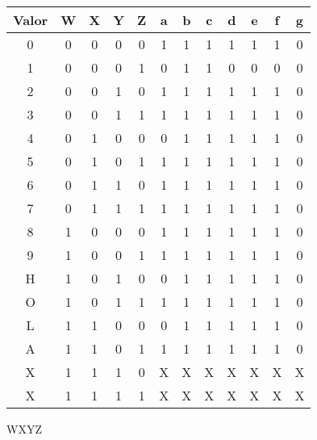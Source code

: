 


  \begin{center}
    \begin{tabular}{ c | c | c | c | c || c | c | c | c | c | c | c}
      Valor & W & X & Y & Z & a & b & c & d & e & f & g \\
      \toprule
      0 & 0 & 0 & 0 & 0 & 1 & 1 & 1 & 1 & 1 & 1 & 0 \\
      1 & 0 & 0 & 0 & 1 & 0 & 1 & 1 & 0 & 0 & 0 & 0 \\
      \midrule
      2 & 0 & 0 & 1 & 0 & 1 & 1 & 1 & 1 & 1 & 1 & 0 \\
      3 & 0 & 0 & 1 & 1 & 1 & 1 & 1 & 1 & 1 & 1 & 0 \\
      \midrule
      4 & 0 & 1 & 0 & 0 & 0 & 1 & 1 & 1 & 1 & 1 & 0 \\
      5 & 0 & 1 & 0 & 1 & 1 & 1 & 1 & 1 & 1 & 1 & 0 \\
      \midrule
      6 & 0 & 1 & 1 & 0 & 1 & 1 & 1 & 1 & 1 & 1 & 0 \\
      7 & 0 & 1 & 1 & 1 & 1 & 1 & 1 & 1 & 1 & 1 & 0 \\
      \midrule
      8 & 1 & 0 & 0 & 0 & 1 & 1 & 1 & 1 & 1 & 1 & 0 \\
      9 & 1 & 0 & 0 & 1 & 1 & 1 & 1 & 1 & 1 & 1 & 0 \\
      \midrule
      H & 1 & 0 & 1 & 0 & 0 & 1 & 1 & 1 & 1 & 1 & 0 \\
      O & 1 & 0 & 1 & 1 & 1 & 1 & 1 & 1 & 1 & 1 & 0 \\
      \midrule
      L & 1 & 1 & 0 & 0 & 0 & 1 & 1 & 1 & 1 & 1 & 0 \\
      A & 1 & 1 & 0 & 1 & 1 & 1 & 1 & 1 & 1 & 1 & 0 \\
      \midrule
      X & 1 & 1 & 1 & 0 & X & X & X & X & X & X & X \\
      X & 1 & 1 & 1 & 1 & X & X & X & X & X & X & X \\
      \bottomrule
    \end{tabular}
  \end{center}



  \begin{center}
    \begin{Karnaugh}{W}{X}{Y}{Z}
    \end{Karnaugh}
  \end{center}

